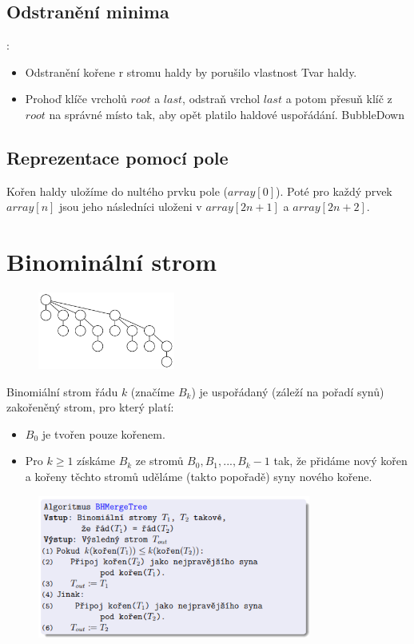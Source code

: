 \documentclass{szzclass}
\begin{document}
\subsection{Odstranění minima}:
\begin{itemize}
    \item Odstranění kořene r stromu haldy by porušilo vlastnost Tvar haldy.
    \item Prohoď klíče vrcholů $root$ a $last$, odstraň vrchol $last$ a potom přesuň klíč z $root$ na správné místo tak, aby opět platilo haldové uspořádání. BubbleDown
\end{itemize}

\subsection{Reprezentace pomocí pole}
Kořen haldy uložíme do nultého prvku pole ($array[0]$). Poté pro každý prvek $array[n]$ jsou jeho následníci uloženi v $array[2n+1]$ a $array[2n+2]$.


\section{Binominální strom}

\begin{figure}[h]
\centering
\includegraphics[width=0.4\textwidth]{topics/bi-spol-5/images/binominal-tree.png}
\end{figure}

Binomiální strom řádu $k$ (značíme $B_k$) je uspořádaný (záleží na
pořadí synů) zakořeněný strom, pro který platí:
\begin{itemize}
    \item $B_0$ je tvořen pouze kořenem.
    \item Pro $k \geq 1$ získáme $B_k$ ze stromů $B_0, B_1, . . . , B_k−1$ tak, že
    přidáme nový kořen a kořeny těchto stromů uděláme (takto
    popořadě) syny nového kořene.
\end{itemize}

\begin{figure}[h!]
\centering
\includegraphics[width=0.8\textwidth]{topics/bi-spol-5/images/BHMerge.png}
\end{figure}
\end{document}
